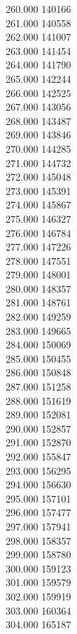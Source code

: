 { 260.000	140166 \\
 261.000	140558 \\
 262.000	141007 \\
 263.000	141454 \\
 264.000	141790 \\
 265.000	142244 \\
 266.000	142525 \\
 267.000	143056 \\
 268.000	143487 \\
 269.000	143846 \\
 270.000	144285 \\
 271.000	144732 \\
 272.000	145048 \\
 273.000	145391 \\
 274.000	145867 \\
 275.000	146327 \\
 276.000	146784 \\
 277.000	147226 \\
 278.000	147551 \\
 279.000	148001 \\
 280.000	148357 \\
 281.000	148761 \\
 282.000	149259 \\
 283.000	149665 \\
 284.000	150069 \\
 285.000	150455 \\
 286.000	150848 \\
 287.000	151258 \\
 288.000	151619 \\
 289.000	152081 \\
 290.000	152857 \\
 291.000	152870 \\
 292.000	155847 \\
 293.000	156295 \\
 294.000	156630 \\
 295.000	157101 \\
 296.000	157477 \\
 297.000	157941 \\
 298.000	158357 \\
 299.000	158780 \\
 300.000	159123 \\
 301.000	159579 \\
 302.000	159919 \\
 303.000	160364 \\
 304.000	165187 \\
}
